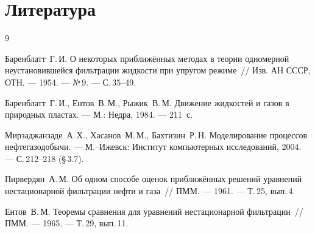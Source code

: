 \documentclass[12pt,a4paper]{article}
\begin{document}
\section*{Литература}

\begin{thebibliography}{9}

  Баренблатт~Г.\,И. О некоторых приближённых методах в теории
  одномерной неустановившейся фильтрации жидкости при упругом
  режиме~// Изв. АН СССР, ОТН. --- 1954. --- №\,9. --- С.\,35--49.

  Баренблатт~Г.\,И., Ентов~В.\,М., Рыжик~В.\,М.
  Движение жидкостей и газов в природных пластах. ---
  М.: Недра, 1984. --- 211~с.

  Мирзаджанзаде~А.\,Х., Хасанов~М.\,М., Бахтизин~Р.\,Н.
  Моделирование процессов нефтегазодобычи. ---
  М.--Ижевск: Институт компьютерных исследований, 2004. ---
  С.\,212--218 (§\,3.7).

  Пирвердян~А.\,М. Об одном способе оценок приближённых решений
  уравнений нестационарной фильтрации нефти и газа~//
  ПММ. --- 1961. --- Т.\,25, вып.\,4.

  Ентов~В.\,М. Теоремы сравнения для уравнений нестационарной
  фильтрации~// ПММ. --- 1965. --- Т.\,29, вып.\,11.

\end{thebibliography}
\end{document}
